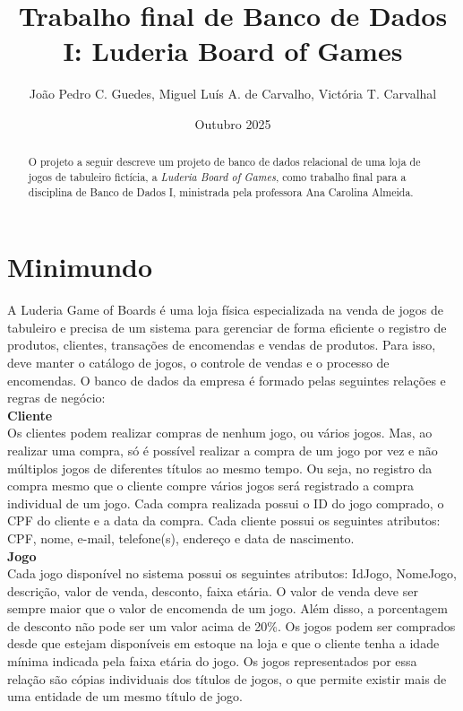 \documentclass[11pt]{article}
\title{Trabalho final de Banco de Dados I: Luderia Board of Games}
\author{João Pedro C. Guedes, Miguel Luís A. de Carvalho, Victória T. Carvalhal}
\date{Outubro 2025}
\begin{document}
\maketitle
\begin{abstract}
O projeto a seguir descreve um projeto de banco de dados relacional de uma loja de jogos de tabuleiro fictícia, a \textit{Luderia Board of Games}, como trabalho final para a disciplina de Banco de Dados I, ministrada pela professora Ana Carolina Almeida.
\end{abstract}

\section{Minimundo}
A Luderia Game of Boards é uma loja física especializada na venda de jogos de tabuleiro e precisa de um sistema para gerenciar de forma eficiente o registro de produtos, clientes, transações de encomendas e vendas de produtos. Para isso, deve manter o catálogo de jogos, o controle de vendas e o processo de encomendas.
O banco de dados da empresa é formado pelas seguintes relações e regras de negócio:\\

\textbf{Cliente}\\
Os clientes podem realizar compras de nenhum jogo, ou vários jogos. Mas, ao realizar uma compra, só é possível realizar a compra de um jogo por vez e não múltiplos jogos de diferentes títulos ao mesmo tempo. Ou seja, no registro da compra mesmo que o cliente compre vários jogos será registrado a compra individual de um jogo. Cada compra realizada possui o ID do jogo comprado, o CPF do cliente e a data da compra. Cada cliente possui os seguintes atributos: CPF, nome, e-mail, telefone(s), endereço e data de nascimento. \\

\textbf{Jogo}\\
Cada jogo disponível no sistema possui os seguintes atributos: IdJogo, NomeJogo, descrição, valor de venda, desconto, faixa etária. O valor de venda deve ser sempre maior que o valor de encomenda de um jogo. Além disso, a porcentagem de desconto não pode ser um valor acima de 20\%. Os jogos podem ser comprados desde que estejam disponíveis em estoque na loja e que o cliente tenha a idade mínima indicada pela faixa etária do jogo. Os jogos representados por essa relação são cópias individuais dos títulos de jogos, o que permite existir mais de uma entidade de um mesmo título de jogo.\\
\end{document}
